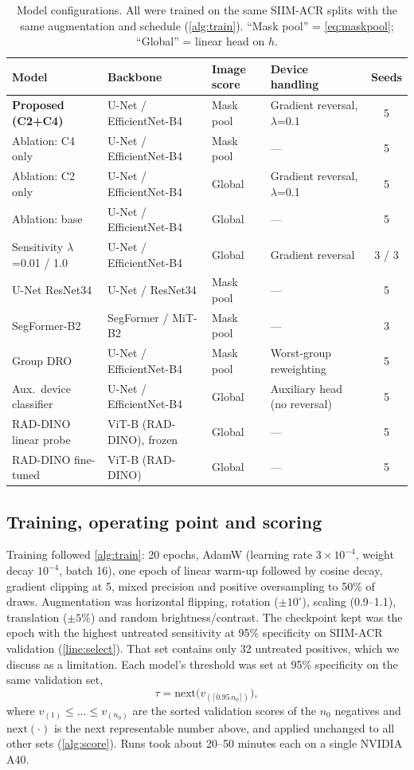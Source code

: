 \documentclass[final,3p]{elsarticle}
\begin{document}
\begin{table}[!tbp]
\centering\small
\caption{Model configurations. All were trained on the same SIIM-ACR splits with the same augmentation and schedule (\cref{alg:train}). ``Mask pool'' = \cref{eq:maskpool}; ``Global'' = linear head on $h$.}
\label{tab:models}
\begin{tabular}{@{}l l l l c@{}}
\toprule
Model & Backbone & Image score & Device handling & Seeds \\
\midrule
\textbf{Proposed (C2+C4)} & U-Net / EfficientNet-B4 & Mask pool & Gradient reversal, $\lambda$=0.1 & 5 \\
Ablation: C4 only & U-Net / EfficientNet-B4 & Mask pool & --- & 5 \\
Ablation: C2 only & U-Net / EfficientNet-B4 & Global & Gradient reversal, $\lambda$=0.1 & 5 \\
Ablation: base & U-Net / EfficientNet-B4 & Global & --- & 5 \\
Sensitivity $\lambda$=0.01 / 1.0 & U-Net / EfficientNet-B4 & Global & Gradient reversal & 3 / 3 \\
U-Net ResNet34 & U-Net / ResNet34 & Mask pool & --- & 5 \\
SegFormer-B2 & SegFormer / MiT-B2 & Mask pool & --- & 3 \\
Group DRO & U-Net / EfficientNet-B4 & Mask pool & Worst-group reweighting & 5 \\
Aux.\ device classifier & U-Net / EfficientNet-B4 & Global & Auxiliary head (no reversal) & 5 \\
RAD-DINO linear probe & ViT-B (RAD-DINO), frozen & Global & --- & 5 \\
RAD-DINO fine-tuned & ViT-B (RAD-DINO) & Global & --- & 5 \\
\bottomrule
\end{tabular}
\end{table}

\subsection{Training, operating point and scoring}
\label{sec:training}
Training followed \cref{alg:train}: 20 epochs, AdamW (learning rate $3\times10^{-4}$, weight decay $10^{-4}$, batch 16), one epoch of linear warm-up followed by cosine decay, gradient clipping at 5, mixed precision and positive oversampling to 50\% of draws. Augmentation was horizontal flipping, rotation ($\pm10^\circ$), scaling (0.9--1.1), translation ($\pm5\%$) and random brightness/contrast. The checkpoint kept was the epoch with the highest untreated sensitivity at 95\% specificity on SIIM-ACR validation (\cref{line:select}). That set contains only 32 untreated positives, which we discuss as a limitation. Each model's threshold was set at 95\% specificity on the same validation set,
\begin{equation}
\tau = \mathrm{next}\big(v_{(\lceil 0.95\,n_0\rceil)}\big),
\label{eq:tau}
\end{equation}
where $v_{(1)}\le\dots\le v_{(n_0)}$ are the sorted validation scores of the $n_0$ negatives and $\mathrm{next}(\cdot)$ is the next representable number above, and applied unchanged to all other sets (\cref{alg:score}). Runs took about 20--50 minutes each on a single NVIDIA A40.
\end{document}
